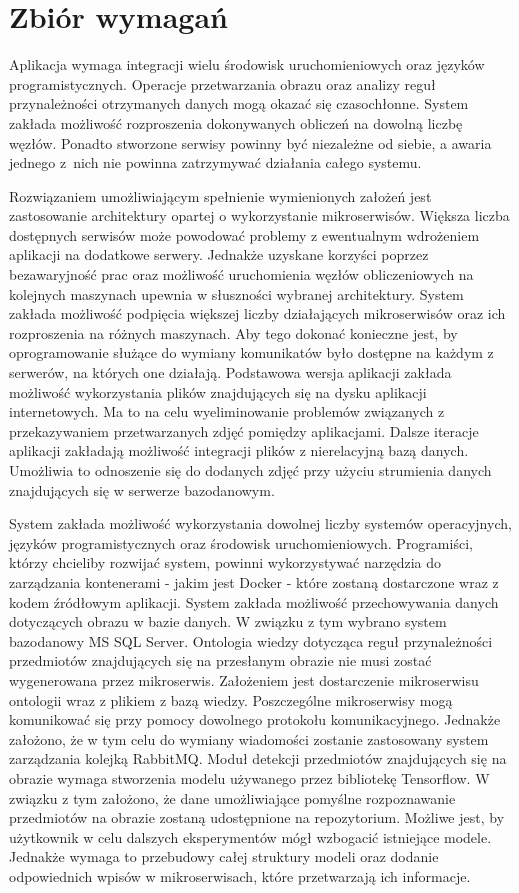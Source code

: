 \section{Zbiór wymagań}{
Aplikacja wymaga integracji wielu środowisk uruchomieniowych oraz języków programistycznych. Operacje przetwarzania obrazu oraz analizy reguł przynależności otrzymanych danych mogą okazać się czasochłonne. System zakłada możliwość rozproszenia dokonywanych obliczeń na dowolną liczbę węzłów. Ponadto stworzone serwisy powinny być niezależne od siebie, a awaria jednego z~nich nie powinna zatrzymywać działania całego systemu. 

Rozwiązaniem umożliwiającym spełnienie wymienionych założeń jest zastosowanie architektury opartej o wykorzystanie mikroserwisów. Większa liczba dostępnych serwisów może powodować problemy z ewentualnym wdrożeniem aplikacji na dodatkowe serwery. Jednakże uzyskane korzyści poprzez bezawaryjność prac oraz możliwość uruchomienia węzłów obliczeniowych na kolejnych maszynach upewnia w słuszności wybranej architektury. System zakłada możliwość podpięcia większej liczby działających mikroserwisów oraz ich rozproszenia na różnych maszynach. Aby tego dokonać konieczne jest, by oprogramowanie służące do wymiany komunikatów było dostępne na każdym z serwerów, na których one działają. Podstawowa wersja aplikacji zakłada możliwość wykorzystania plików znajdujących się na dysku aplikacji internetowych. Ma to na celu wyeliminowanie problemów związanych z przekazywaniem przetwarzanych zdjęć pomiędzy aplikacjami. Dalsze iteracje aplikacji zakładają możliwość integracji plików z nierelacyjną bazą danych. Umożliwia to odnoszenie się do dodanych zdjęć przy użyciu strumienia danych znajdujących się w serwerze bazodanowym.

System zakłada możliwość wykorzystania dowolnej liczby systemów operacyjnych, języków programistycznych oraz środowisk uruchomieniowych. Programiści, którzy chcieliby rozwijać system, powinni wykorzystywać narzędzia do zarządzania kontenerami - jakim jest Docker \cite{Docker}- które zostaną dostarczone wraz z kodem źródłowym aplikacji. System zakłada możliwość przechowywania danych dotyczących obrazu w bazie danych. W związku z tym wybrano system bazodanowy MS SQL Server. Ontologia wiedzy dotycząca reguł przynależności przedmiotów znajdujących się na przesłanym obrazie nie musi zostać wygenerowana przez mikroserwis. Założeniem jest dostarczenie mikroserwisu ontologii wraz z plikiem z bazą wiedzy. Poszczególne mikroserwisy mogą komunikować się przy pomocy dowolnego protokołu komunikacyjnego. Jednakże założono, że w tym celu do wymiany wiadomości zostanie zastosowany system zarządzania kolejką RabbitMQ. Moduł detekcji przedmiotów znajdujących się na obrazie wymaga stworzenia modelu używanego przez bibliotekę Tensorflow. W związku z tym założono, że dane umożliwiające pomyślne rozpoznawanie przedmiotów na obrazie zostaną udostępnione na repozytorium. Możliwe jest, by użytkownik w celu dalszych eksperymentów mógł wzbogacić istniejące modele. Jednakże wymaga to przebudowy całej struktury modeli oraz dodanie odpowiednich wpisów w mikroserwisach, które przetwarzają ich informacje.
}

